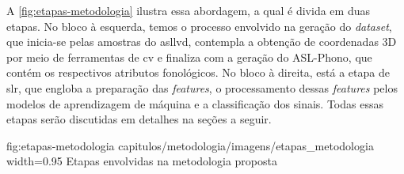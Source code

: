 











A \autoref{fig:etapas-metodologia} ilustra essa abordagem, a qual é divida em duas etapas.
No bloco à esquerda, temos o processo envolvido na geração do \textit{dataset}, que inicia-se pelas amostras do \acrshort{asllvd}, contempla a obtenção de coordenadas 3D por meio de ferramentas de \acrshort{cv} e finaliza com a geração do ASL-Phono, que contém os respectivos atributos fonológicos.
No bloco à direita, está a etapa de \acrlong{slr}, que engloba a preparação das \textit{features}, o processamento dessas \textit{features} pelos modelos de aprendizagem de máquina e a classificação dos sinais.
Todas essas etapas serão discutidas em detalhes na seções a seguir.

\figura
{fig:etapas-metodologia}
{capitulos/metodologia/imagens/etapas_metodologia}
{width=0.95\textwidth}
{Etapas envolvidas na metodologia proposta}
{}












